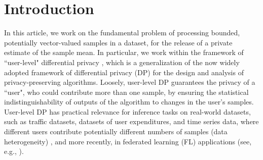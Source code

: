 \documentclass[conference,letterpaper]{IEEEtran}
\theoremstyle{remark}
\theoremstyle{definition}
\begin{document}
\section{Introduction}

In this article, we work on the fundamental problem of processing bounded, potentially vector-valued samples in a dataset, for the release of a private estimate of the sample mean. In particular, we work within the framework of ``user-level" differential privacy \cite{userlevel,hetero}, which is a generalization of the now widely adopted framework of differential privacy (DP) \cite{dworkroth, vadhan2017} for the design and analysis of privacy-preserving algorithms. Loosely, user-level DP guarantees the privacy of a ``user", who could contribute more than one sample, by ensuring the statistical indistinguishability of outputs of the algorithm to changes in the user's samples. User-level DP has practical relevance for inference tasks on real-world datasets, such as traffic datasets, datasets of user expenditures, and time series data, where different users contribute potentially different numbers of samples (data heterogeneity) \cite{usereg3,usereg4}, and more recently, in federated learning (FL) applications (see, e.g., \cite[Sec. 4]{kairouz-survey}). 

\end{document}
